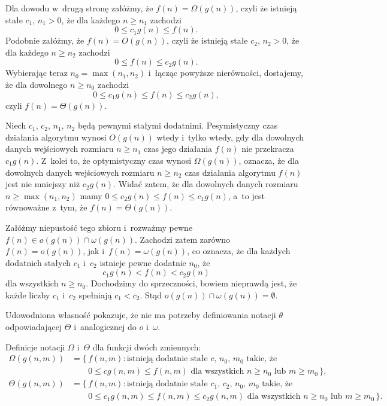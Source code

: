 Dla dowodu w~drugą stronę załóżmy, że $f(n)=\Omega(g(n))$, czyli że istnieją stałe $c_1$, $n_1>0$, że dla każdego $n\ge n_1$ zachodzi
\[
	0 \le c_1g(n) \le f(n).
\]
Podobnie załóżmy, że $f(n)=O(g(n))$, czyli że istnieją stałe $c_2$, $n_2>0$, że dla każdego $n\ge n_2$ zachodzi
\[
	0 \le f(n) \le c_2g(n).
\]
Wybierając teraz $n_0=\max(n_1,n_2)$ i~łącząc powyższe nierówności, dostajemy, że dla dowolnego $n\ge n_0$ zachodzi
\[
	0 \le c_1g(n) \le f(n) \le c_2g(n),
\]
czyli $f(n)=\Theta(g(n))$.

\exercise %
Niech $c_1$, $c_2$, $n_1$, $n_2$ będą pewnymi stałymi dodatnimi.
Pesymistyczny czas działania algorytmu wynosi $O(g(n))$ wtedy i~tylko wtedy, gdy dla dowolnych danych wejściowych rozmiaru $n\ge n_1$ czas jego działania $f(n)$ nie przekracza $c_1g(n)$.
Z~kolei to, że optymistyczny czas wynosi $\Omega(g(n))$, oznacza, że dla dowolnych danych wejściowych rozmiaru $n\ge n_2$ czas działania algorytmu $f(n)$ jest nie mniejszy niż $c_2g(n)$.
Widać zatem, że dla dowolnych danych rozmiaru $n\ge\max(n_1,n_2)$ mamy $0\le c_2g(n)\le f(n)\le c_1g(n)$, a~to jest równoważne z~tym, że $f(n)=\Theta(g(n))$.

\exercise %
Załóżmy niepustość tego zbioru i~rozważmy pewne $f(n)\in o(g(n))\cap\omega(g(n))$.
Zachodzi zatem zarówno $f(n)=o(g(n))$, jak i~$f(n)=\omega(g(n))$, co oznacza, że dla każdych dodatnich stałych $c_1$ i~$c_2$ istnieje pewne dodatnie $n_0$, że
\[
	c_1g(n) < f(n) < c_2g(n)
\]
dla wszystkich $n\ge n_0$.
Dochodzimy do sprzeczności, bowiem nieprawdą jest, że każde liczby $c_1$ i~$c_2$ spełniają $c_1<c_2$.
Stąd $o(g(n))\cap\omega(g(n))=\emptyset$.

Udowodniona własność pokazuje, że nie ma potrzeby definiowania notacji $\theta$ odpowiadającej $\Theta$ i~analogicznej do $o$ i~$\omega$.

\exercise %

\noindent Definicje notacji $\Omega$ i~$\Theta$ dla funkcji dwóch zmiennych:
\[
	\begin{split}
		\Omega(g(n,m)) &= \bigl\{\,f(n,m):\text{istnieją dodatnie stałe $c$, $n_0$, $m_0$ takie, że} \\
		&\qquad 0 \le cg(n,m) \le f(n,m) \text{ dla wszystkich $n \ge n_0$ lub $m \ge m_0$}\,\bigr\}, \\[2mm]
		\Theta(g(n,m)) &= \bigl\{\,f(n,m):\text{istnieją dodatnie stałe $c_1$, $c_2$, $n_0$, $m_0$ takie, że} \\
		&\qquad 0 \le c_1g(n,m) \le f(n,m) \le c_2g(n,m) \text{ dla wszystkich $n \ge n_0$ lub $m \ge m_0$}\,\bigr\}.
	\end{split}
\]
